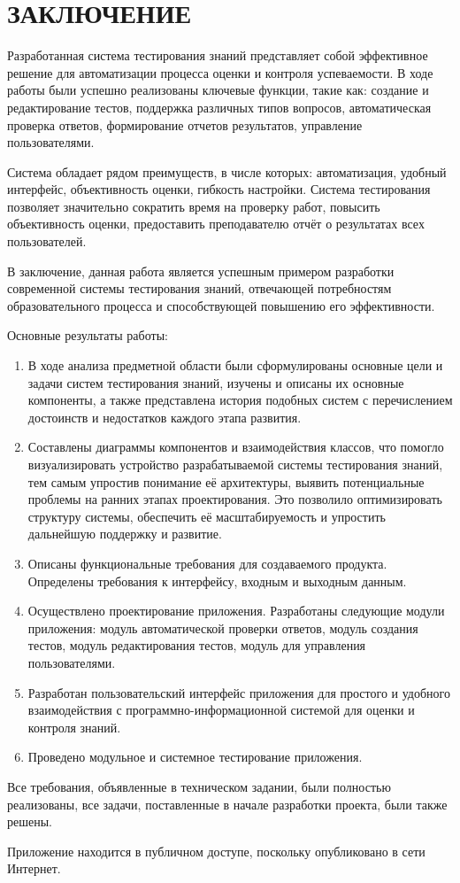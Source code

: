 \section*{ЗАКЛЮЧЕНИЕ}

Разработанная система тестирования знаний представляет собой эффективное решение для автоматизации процесса оценки и контроля успеваемости. В ходе работы были успешно реализованы ключевые функции, такие как: создание и редактирование тестов, поддержка различных типов вопросов, автоматическая проверка ответов, формирование отчетов результатов, управление пользователями.

Система обладает рядом преимуществ, в числе которых: автоматизация, удобный интерфейс, объективность оценки, гибкость настройки. Система тестирования позволяет значительно сократить время на проверку работ, повысить объективность оценки, предоставить преподавателю отчёт о результатах всех пользователей.

В заключение, данная работа является успешным примером разработки современной системы тестирования знаний, отвечающей потребностям образовательного процесса и способствующей повышению его эффективности.

Основные результаты работы:

\begin{enumerate}
\item В ходе анализа предметной области были сформулированы основные цели и задачи систем тестирования знаний, изучены и описаны их основные компоненты, а также представлена история подобных систем с перечислением достоинств и недостатков каждого этапа развития.
\item Составлены диаграммы компонентов и взаимодействия классов, что помогло визуализировать устройство разрабатываемой системы тестирования знаний, тем самым упростив понимание её архитектуры, выявить потенциальные проблемы на ранних этапах проектирования. Это позволило оптимизировать структуру системы, обеспечить её масштабируемость и упростить дальнейшую поддержку и развитие.
\item Описаны функциональные требования для создаваемого продукта. Определены требования к интерфейсу, входным и выходным данным.
\item Осуществлено проектирование приложения. Разработаны следующие модули приложения: модуль автоматической проверки ответов, модуль создания тестов, модуль редактирования тестов, модуль для управления пользователями. 
\item Разработан пользовательский интерфейс приложения для простого и удобного взаимодействия с программно-информационной системой для оценки и контроля  знаний.
\item Проведено модульное и системное тестирование приложения.
\end{enumerate}

Все требования, объявленные в техническом задании, были полностью реализованы, все задачи, поставленные в начале разработки проекта, были также решены.

Приложение находится в публичном доступе, поскольку опубликовано в сети Интернет.  
